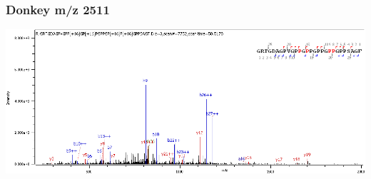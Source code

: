 \documentclass[
]{article}
\begin{document}
\hypertarget{donkey-mz-2511}{%
\subsubsection*{Donkey m/z 2511}\label{donkey-mz-2511}}

\begin{center}\includegraphics[width=1\linewidth]{../img/1498-2511} \end{center}

\newpage
\end{document}
